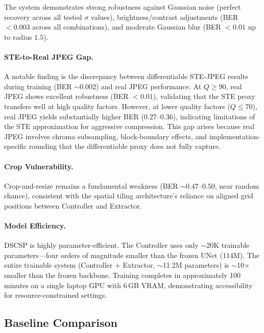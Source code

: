 \documentclass[10pt, twocolumn]{article}
\begin{document}
The system demonstrates strong robustness against Gaussian noise (perfect recovery across all tested $\sigma$ values), brightness/contrast adjustments (BER $< 0.003$ across all combinations), and moderate Gaussian blur (BER $< 0.01$ up to radius $1.5$).

\paragraph{STE-to-Real JPEG Gap.}
A notable finding is the discrepancy between differentiable STE-JPEG results during training (BER $\sim 0.002$) and real JPEG performance.
At $Q \geq 90$, real JPEG shows excellent robustness (BER $< 0.01$), validating that the STE proxy transfers well at high quality factors.
However, at lower quality factors ($Q \leq 70$), real JPEG yields substantially higher BER ($0.27$--$0.36$), indicating limitations of the STE approximation for aggressive compression.
This gap arises because real JPEG involves chroma subsampling, block-boundary effects, and implementation-specific rounding that the differentiable proxy does not fully capture.

\paragraph{Crop Vulnerability.}
Crop-and-resize remains a fundamental weakness (BER $\sim 0.47$--$0.50$, near random chance), consistent with the spatial tiling architecture's reliance on aligned grid positions between Controller and Extractor.

\paragraph{Model Efficiency.}
DSCSP is highly parameter-efficient.
The Controller uses only $\sim$20K trainable parameters---four orders of magnitude smaller than the frozen UNet (114M).
The entire trainable system (Controller + Extractor, $\sim$11.2M parameters) is $\sim$10$\times$ smaller than the frozen backbone.
Training completes in approximately 100 minutes on a single laptop GPU with 6\,GB VRAM, demonstrating accessibility for resource-constrained settings.


\subsection{Baseline Comparison}
\label{sec:baselines}
\end{document}
